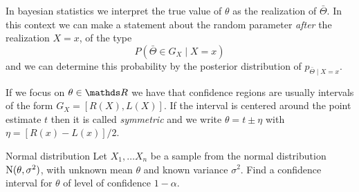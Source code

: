 \documentclass[12pt]{extarticle}
\newcommand{\Normal}{{\operatorfont N}}
\begin{document}
In bayesian statistics we interpret the true value of $\theta$ as the realization of $\bar \Theta$.
In this context we can make a statement about the random parameter \emph{after} the realization $X = x$, of the type
\begin{equation}
	P(\bar \Theta \in G_X \mid X = x)
\end{equation}
and we can determine this probability by the posterior distribution of $p_{\bar \Theta \mid X = x}$.

If we focus on $\theta \in \R$ we have that confidence regions are usually intervals of the form $G_X = [R(X), L(X)]$.
If the interval is centered around the point estimate $t$ then it is called \emph{symmetric} and we write $\theta = t \pm \eta$ with $\eta = [R(x) - L(x)]/2$.

\begin{example}{Normal distribution}{}
	Let $X_1, \dots X_n$ be a sample from the normal distribution $\Normal(\theta, \sigma^2)$, with unknown mean $\theta$ and known variance $\sigma^2$.
	Find a confidence interval for $\theta$ of level of confidence $1-\alpha$.
\end{example}
\end{document}
